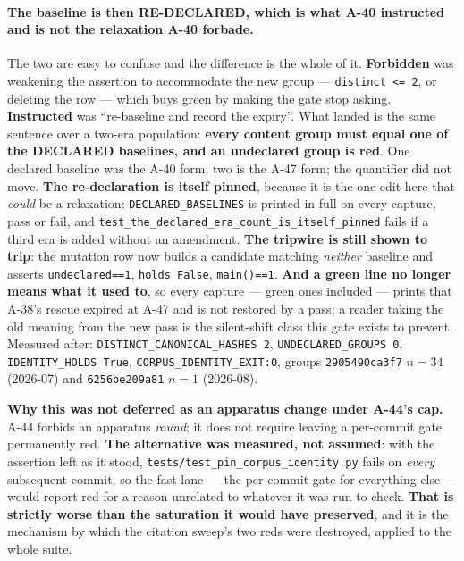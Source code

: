 \documentclass[
  10pt,
]{article}
\begin{document}
\paragraph{The baseline is then RE-DECLARED, which is what A-40 instructed and is not the relaxation A-40 forbade.}
The two are easy to confuse and the difference is the whole of it. \textbf{Forbidden} was weakening the assertion to accommodate the new group --- \texttt{distinct <= 2}, or deleting the row --- which buys green by making the gate stop asking. \textbf{Instructed} was ``re-baseline and record the expiry''. What landed is the same sentence over a two-era population: \textbf{every content group must equal one of the DECLARED baselines, and an undeclared group is red}. One declared baseline was the A-40 form; two is the A-47 form; the quantifier did not move. \textbf{The re-declaration is itself pinned}, because it is the one edit here that \emph{could} be a relaxation: \texttt{DECLARED\_BASELINES} is printed in full on every capture, pass or fail, and \texttt{test\_the\_declared\_era\_count\_is\_itself\_pinned} fails if a third era is added without an amendment. \textbf{The tripwire is still shown to trip}: the mutation row now builds a candidate matching \emph{neither} baseline and asserts \texttt{undeclared==1}, \texttt{holds False}, \texttt{main()==1}. \textbf{And a green line no longer means what it used to}, so every capture --- green ones included --- prints that A-38's rescue expired at A-47 and is not restored by a pass; a reader taking the old meaning from the new pass is the silent-shift class this gate exists to prevent. Measured after: \texttt{DISTINCT\_CANONICAL\_HASHES 2}, \texttt{UNDECLARED\_GROUPS 0}, \texttt{IDENTITY\_HOLDS True}, \texttt{CORPUS\_IDENTITY\_EXIT:0}, groups \texttt{2905490ca3f7} $n{=}34$ (2026-07) and \texttt{6256be209a81} $n{=}1$ (2026-08).

\textbf{Why this was not deferred as an apparatus change under A-44's cap.} A-44 forbids an apparatus \emph{round}; it does not require leaving a per-commit gate permanently red. \textbf{The alternative was measured, not assumed}: with the assertion left as it stood, \texttt{tests/\allowbreak{}test\_pin\_corpus\_identity.py} fails on \emph{every} subsequent commit, so the fast lane --- the per-commit gate for everything else --- would report red for a reason unrelated to whatever it was run to check. \textbf{That is strictly worse than the saturation it would have preserved}, and it is the mechanism by which the citation sweep's two reds were destroyed, applied to the whole suite.
\end{document}

